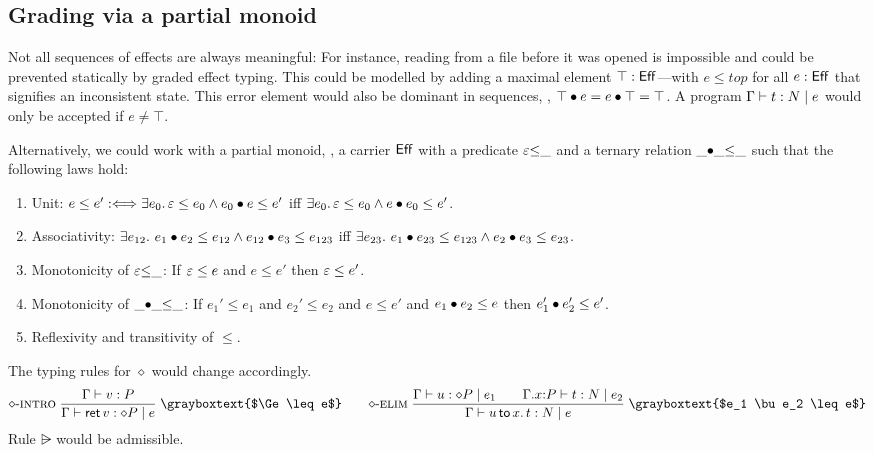 \documentclass[acmsmall,review,anonymous]{acmart}\settopmatter{printfolios=true,printccs=false,printacmref=false}
\newcommand{\graybox}[1]{\grayboxtext{$#1$}}
\begin{document}
\subsection{Grading via a partial monoid}

Not all sequences of effects are always meaningful: For instance,
reading from a file before it was opened is impossible and could be
prevented statically by graded effect typing.  This could be modelled
by adding a maximal element $\top : \Eff$---with $e \leq top$ for all
$e : \Eff$ that signifies an inconsistent state.  This error element
would also be dominant in sequences, \ie,
$\top \bu e = e \bu \top = \top$.
A program $\CompTy \Gamma t e N$ would only be accepted if $e \not= \top$.

Alternatively, we could work with a partial monoid, \ie, a carrier $\Eff$ with a predicate $\Ge{\leq}\_$ and a ternary relation $\_{\bu}\_{\leq}\_$ such that
the following laws hold:
\begin{enumerate}
\item Unit: $e \leq e' \defiff \exists e_0.\, \Ge \leq e_0 \land e_0 \bu e \leq e'$ iff $\exists e_0.\, \Ge \leq e_0 \land e \bu e_0 \leq e'$.
\item Associativity: $\exists e_{12}.\ e_1 \bu e_2 \leq e_{12} \land e_{12} \bu e_3 \leq e_{123}$ iff $\exists e_{23}.\ e_1 \bu e_{23} \leq e_{123} \land e_2 \bu e_3 \leq e_{23}$.
\item Monotonicity of $\Ge{\leq}\_$: If $\Ge \leq e$ and $e \leq e'$ then $\Ge \leq e'$.
\item Monotonicity of $\_{\bu}\_{\leq}\_$:  If $e_1' \leq e_1$ and $e_2' \leq e_2$ and $e \leq e'$ and $e_1 \bu e_2 \leq e$ then $e_1' \bu e_2' \leq e'$.
\item Reflexivity and transitivity of $\leq$.
\end{enumerate}
The typing rules for $\diamond$ would change accordingly.
\begin{gather*}
 \nrux{\rintro\diamond}
     {\ValTy \Gamma v P
    }{\CompTy \Gamma {\ret v} e {\diamond P}
    }{\graybox{\Ge \leq e}}
\qquad
 \nrux{\relim\diamond}
     {\CompTy \Gamma u {e_1} {\diamond P} \qquad
      \CompTy {\ext \Gamma x P} t {e_2} N
    }{\CompTy \Gamma {\bind x u t} e N
    }{\graybox{e_1 \bu e_2 \leq e}}
\end{gather*}
Rule $\rsub$ would be admissible.
\end{document}
